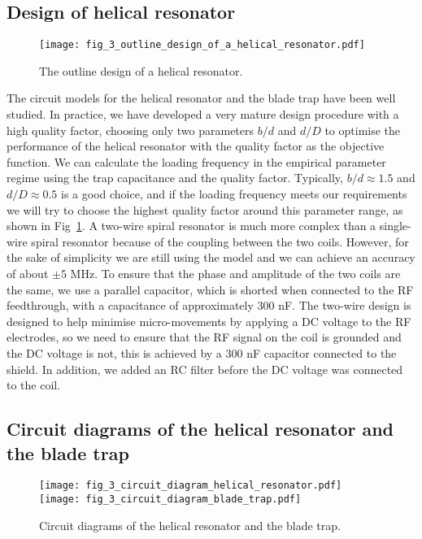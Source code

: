 \subsection{Design of helical resonator}

\begin{figure}
    \centering
    \texttt{[image: fig\_3\_outline\_design\_of\_a\_helical\_resonator.pdf]}
    \caption{The outline design of a helical resonator.}
    \label{fig:outline_design_of_a_helical_resonator}
\end{figure}

The circuit models for the helical resonator and the blade trap have been well studied. In practice, we have developed a very mature design procedure with a high quality factor, choosing only two parameters $ b / d $ and $ d / D $ to optimise the performance of the helical resonator with the quality factor as the objective function. We can calculate the loading frequency in the empirical parameter regime using the trap capacitance and the quality factor. Typically, $ b / d \approx 1.5 $ and $ d / D \approx 0.5 $ is a good choice, and if the loading frequency meets our requirements we will try to choose the highest quality factor around this parameter range, as shown in Fig~\ref{fig:outline_design_of_a_helical_resonator}. A two-wire spiral resonator is much more complex than a single-wire spiral resonator because of the coupling between the two coils. However, for the sake of simplicity we are still using the model and we can achieve an accuracy of about $\pm 5$ MHz. To ensure that the phase and amplitude of the two coils are the same, we use a parallel capacitor, which is shorted when connected to the RF feedthrough, with a capacitance of approximately 300 nF. The two-wire design is designed to help minimise micro-movements by applying a DC voltage to the RF electrodes, so we need to ensure that the RF signal on the coil is grounded and the DC voltage is not, this is achieved by a 300 nF capacitor connected to the shield. In addition, we added an RC filter before the DC voltage was connected to the coil.

\subsection{Circuit diagrams of the helical resonator and the blade trap}

\begin{figure}
    \centering
    {\texttt{[image: fig\_3\_circuit\_diagram\_helical\_resonator.pdf]}}
    {\texttt{[image: fig\_3\_circuit\_diagram\_blade\_trap.pdf]}}
    \caption{Circuit diagrams of the helical resonator and the blade trap.}
    \label{fig:circuit_diagram}
\end{figure}

